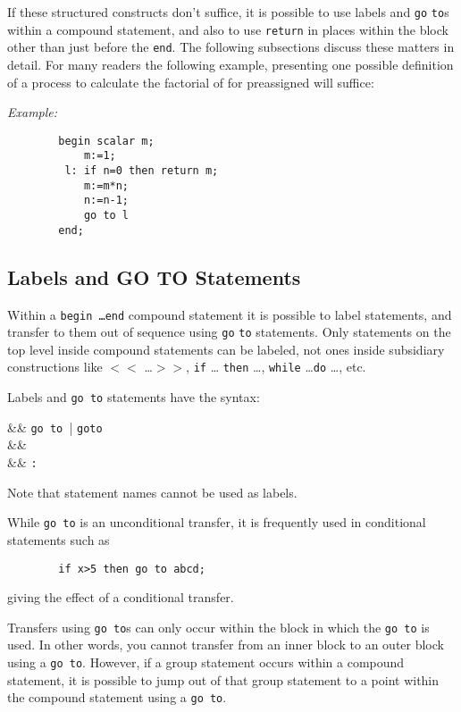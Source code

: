 If these structured constructs don't suffice, it is possible to use labels
 and \texttt{go} \texttt{to}s within a compound
statement, and also to use \texttt{return}
 in places within the block other than just before the
\texttt{end}.  The following subsections discuss these matters in detail.
For many readers the following example, presenting one possible definition
of a process to calculate the factorial of  for preassigned 
will suffice:

\textit{Example:}
\begin{verbatim}
        begin scalar m;
            m:=1;
         l: if n=0 then return m;
            m:=m*n;
            n:=n-1;
            go to l
        end;
\end{verbatim}

\subsection{Labels and GO TO Statements}
\hypertarget{command:GOTO}{}

Within a \texttt{begin \ldots end} compound
statement it is possible to label statements, and transfer to them out of
sequence using \texttt{go} \texttt{to} statements.  Only statements on the top
level inside compound statements can be labeled, not ones inside
subsidiary constructions like \texttt{$<<$} \ldots \texttt{$>>$}, \texttt{if} \ldots
\texttt{then} \ldots , \texttt{while} \ldots \texttt{do} \ldots , etc.

Labels and \texttt{go to} statements have the syntax:
\begin{syntaxtable}
   &\BNFprod& \texttt{go to }|%
                                    \texttt{goto } \\
   &\BNFprod& \\
   &\BNFprod& \texttt{:}
\end{syntaxtable}
Note that statement names cannot be used as labels.

While \texttt{go to} is an unconditional transfer, it is frequently used
in conditional statements such as
\begin{verbatim}
        if x>5 then go to abcd;
\end{verbatim}
giving the effect of a conditional transfer.

Transfers using \texttt{go to}s can only occur within the block in which the
\texttt{go to} is used.  In other words, you cannot transfer from an inner
block to an outer block using a \texttt{go to}.  However, if a group statement
occurs within a compound statement, it is possible to jump out of that group
statement to a point within the compound statement using a \texttt{go to}.

